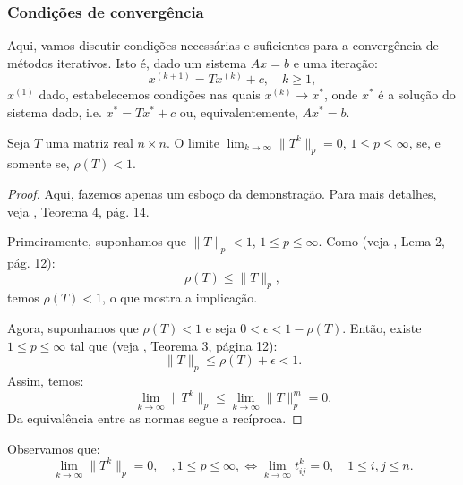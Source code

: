 \subsubsection{Condições de convergência}

Aqui, vamos discutir condições necessárias e suficientes para a convergência de métodos iterativos. Isto é, dado um sistema $Ax = b$ e uma iteração:
\begin{equation*}
  x^{(k+1)} = Tx^{(k)} + c,\quad k\geq 1,
\end{equation*}
$x^{(1)}$ dado, estabelecemos condições nas quais $x^{(k)}\to x^{*}$, onde $x^*$ é a solução do sistema dado, i.e. $x^* = Tx^* + c$ ou, equivalentemente, $Ax^* = b$.

\begin{lem}\label{lema:matriz_convergente}
  Seja $T$ uma matriz real $n\times n$. O limite $\displaystyle\lim_{k\to\infty} \|T^k\|_p = 0$, $1\leq p \leq \infty$, se, e somente se, $\rho(T) < 1$. 
\end{lem}
\begin{proof}
  Aqui, fazemos apenas um esboço da demonstração. Para mais detalhes, veja \cite{Isaacson1994a}, Teorema 4, pág. 14.

  Primeiramente, suponhamos que $\|T\|_p < 1$, $1\leq p \leq \infty$. Como (veja \cite{Isaacson1994a}, Lema 2, pág. 12):
  \begin{equation*}
    \rho(T) \leq \|T\|_p,
  \end{equation*}
temos $\rho(T) < 1$, o que mostra a implicação.

  Agora, suponhamos que $\rho(T) < 1$ e seja $0 < \epsilon < 1 - \rho(T)$. Então, existe $1\leq p \leq \infty$ tal que (veja \cite{Isaacson1994a}, Teorema 3, página 12):
  \begin{equation*}
    \|T\|_p \leq \rho(T) + \epsilon < 1.
  \end{equation*}
Assim, temos:
\begin{equation*}
  \lim_{k\to\infty} \|T^k\|_p \leq \lim_{k\to\infty} \|T\|_p^m = 0.
\end{equation*}
Da equivalência entre as normas segue a recíproca.
\end{proof}

\begin{obs}\label{obs:matriz_convergente}
  Observamos que:
  \begin{equation*}
    \lim_{k\to\infty} \|T^k\|_p = 0,\quad,1\leq p\leq \infty,\Leftrightarrow \lim_{k\to\infty} t_{ij}^k = 0,\quad 1\leq i,j\leq n.
  \end{equation*}
\end{obs}

